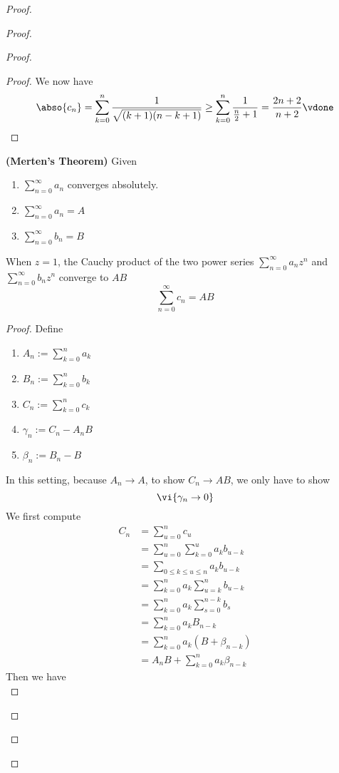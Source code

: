 \documentclass{report}
\begin{document}
\begin{proof}
\begin{proof}
\begin{proof}
\begin{proof}
We now have
\begin{equation*}
\abso{c_n}=\sum_{k=0}^n \frac{1}{\sqrt{(k+1)(n-k+1)} }\geq \sum_{k=0}^n \frac{1}{\frac{n}{2}+1}=\frac{2n+2}{n+2}\vdone
\end{equation*}
\end{proof}
\begin{theorem}
\label{4.7.3}
\textbf{(Merten's Theorem)} Given 
\begin{enumerate}[label=(\alph*)]
  \item $\sum_{n=0}^\infty a_n$ converges absolutely.
  \item $\sum_{n=0}^\infty a_n=A$ 
  \item $\sum_{n=0}^\infty b_n=B$
\end{enumerate}
When $z=1$,  the Cauchy product of the two power series $\sum_{n=0}^\infty a_nz^n$ and $\sum_{n=0}^\infty b_nz^n$  converge to $AB$
 \begin{equation*}
\sum_{n=0}^\infty c_n=AB
\end{equation*}
\end{theorem}
\begin{proof}
Define 
\begin{enumerate}[label=(\alph*)]
  \item $A_n:=\sum_{k=0}^n a_k$ 
  \item $B_n:=\sum_{k=0}^n b_k$
  \item $C_n:=\sum_{k=0}^n c_k$
  \item $\gamma_n := C_n-A_nB$
  \item $\beta_n:=B_n-B$
\end{enumerate}
In this setting, because $A_n \to A$, to show $C_n\to AB$, we only have to show 
\begin{equation*}
  \vi{ \gamma_n \to 0}
\end{equation*}
We first compute 
\begin{align*}
C_n&=\sum_{u=0}^n c_u\\
&= \sum_{u=0}^n \sum_{k=0}^u a_k b_{u-k}\\
&= \sum_{0\leq k\leq u\leq n} a_kb_{u-k}\\
&= \sum_{k=0}^n a_k \sum_{u=k}^n b_{u-k}\\
&=\sum_{k=0}^n a_k \sum_{s=0}^{n-k} b_s\\
&=\sum_{k=0}^n a_k B_{n-k}\\
&=\sum_{k=0}^n a_k (B+\beta_{n-k})\\
&=A_nB+\sum_{k=0}^n a_k\beta_{n-k}
\end{align*}
Then we have 
\begin{equation*}

\end{equation*}
\end{proof}
\end{proof}
\end{proof}
\end{proof}
\end{document}
